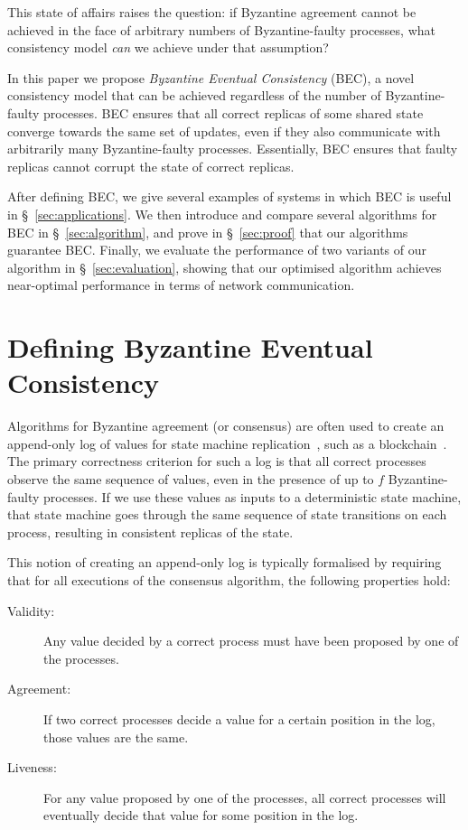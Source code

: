 \documentclass[a4paper,anonymous,USenglish]{lipics-v2019}
\begin{document}
This state of affairs raises the question: if Byzantine agreement cannot be achieved in the face of arbitrary numbers of Byzantine-faulty processes, what consistency model \emph{can} we achieve under that assumption?

In this paper we propose \emph{Byzantine Eventual Consistency} (BEC), a novel consistency model that can be achieved regardless of the number of Byzantine-faulty processes.
BEC ensures that all correct replicas of some shared state converge towards the same set of updates, even if they also communicate with arbitrarily many Byzantine-faulty processes.
Essentially, BEC ensures that faulty replicas cannot corrupt the state of correct replicas.

After defining BEC, we give several examples of systems in which BEC is useful in \S~\ref{sec:applications}.
We then introduce and compare several algorithms for BEC in \S~\ref{sec:algorithm}, and prove in \S~\ref{sec:proof} that our algorithms guarantee BEC.
Finally, we evaluate the performance of two variants of our algorithm in \S~\ref{sec:evaluation}, showing that our optimised algorithm achieves near-optimal performance in terms of network communication.


\section{Defining Byzantine Eventual Consistency}\label{sec:properties}

Algorithms for Byzantine agreement (or consensus) are often used to create an append-only log of values for state machine replication~\cite{Schneider:1990}, such as a blockchain~\cite{Bano:2019}.
The primary correctness criterion for such a log is that all correct processes observe the same sequence of values, even in the presence of up to $f$ Byzantine-faulty processes.
If we use these values as inputs to a deterministic state machine, that state machine goes through the same sequence of state transitions on each process, resulting in consistent replicas of the state.

This notion of creating an append-only log is typically formalised by requiring that for all executions of the consensus algorithm, the following properties hold:

\begin{description}
\item[Validity:] Any value decided by a correct process must have been proposed by one of the processes.
\item[Agreement:] If two correct processes decide a value for a certain position in the log, those values are the same.
\item[Liveness:] For any value proposed by one of the processes, all correct processes will eventually decide that value for some position in the log.
\end{description}
\end{document}
